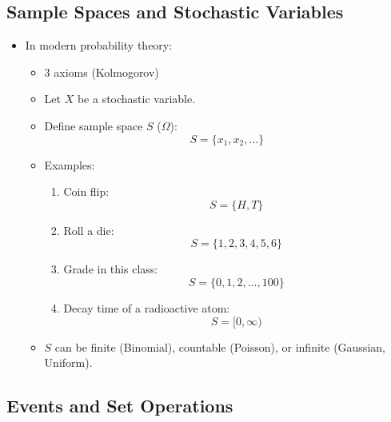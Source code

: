 \subsection{Sample Spaces and Stochastic Variables}

\begin{itemize}
    \item In modern probability theory:
          \begin{itemize}
              \item 3 axioms (Kolmogorov)
              \item Let $X$ be a stochastic variable.
              \item Define sample space $S$ ($\Omega$):
                    \[ S = \{x_1, x_2, ...\} \]
              \item Examples:
                    \begin{enumerate}
                        \item Coin flip:
                              \[ S = \{H, T\} \]
                        \item Roll a die:
                              \[ S = \{1, 2, 3, 4, 5, 6\} \]
                        \item Grade in this class:
                              \[ S = \{0, 1, 2, ..., 100\} \]
                        \item Decay time of a radioactive atom:
                              \[ S = [0, \infty) \]
                    \end{enumerate}
              \item $S$ can be finite (Binomial), countable (Poisson), or infinite (Gaussian, Uniform).
          \end{itemize}
\end{itemize}

\subsection{Events and Set Operations}


